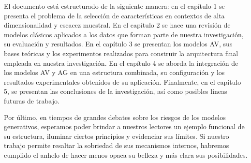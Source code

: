 El documento está estructurado de la siguiente manera: en el capítulo 1 se presenta el problema de la selección de características en contextos de alta dimensionalidad y escacez muestral. En el capítulo 2 se hace una revisión de modelos clásicos aplicados a los datos que forman parte de nuestra investigación, su evaluación y resultados. En el capítulo 3 se presentan los modelos AV, sus bases teóricas y los experimentos realizados para construir la arquitectura final empleada en nuestra investigación. En el capítulo 4 se aborda la integración de los modelos AV y AG en una estructura combinada, su configuración y los resultados experimentales obtenidos de su aplicación. Finalmente, en el capítulo 5, se presentan las conclusiones de la investigación, así como posibles líneas futuras de trabajo.

Por último, en tiempos de grandes debates sobre los riesgos de los modelos generativos, esperamos poder brindar a nuestros lectores un ejemplo funcional de su estructura, iluminar ciertos principios y evidenciar sus límites. Si nuestro trabajo permite resaltar la sobriedad de sus mecanismos internos, habremos cumplido el anhelo de hacer menos opaca su belleza y más clara sus posibilidades.